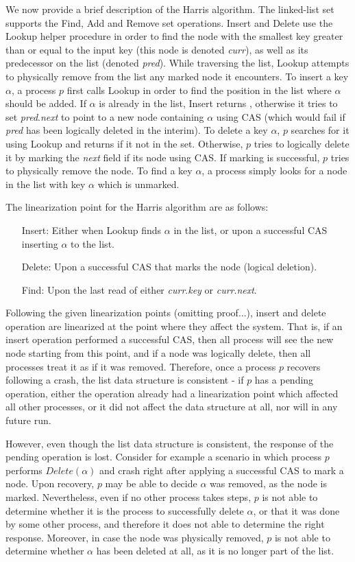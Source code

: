 We now provide a brief description of the Harris algorithm. The linked-list set supports the Find, Add and Remove set operations. Insert and Delete use the Lookup helper procedure in order to find the node with the smallest key greater than or equal to the input key (this node is denoted \emph{curr}), as well as its predecessor on the list (denoted \emph{pred}). While traversing the list, Lookup attempts to physically remove from the list any marked node it encounters. To insert a key $\alpha$, a process $p$ first calls Lookup in order to find the position in the list where $\alpha$ should be added. If $\alpha$ is already in the list, Insert returns \False, otherwise it tries to set \emph{pred}.\emph{next} to point to a new node containing $\alpha$ using CAS (which would fail if \emph{pred} has been logically deleted in the interim). To delete a key $\alpha$, $p$ searches for it using Lookup and returns \False if it not in the set. Otherwise, $p$ tries to logically delete it by marking the \emph{next} field if its node using CAS. If marking is successful, $p$  tries to physically remove the node. To find a key $\alpha$, a process simply looks for a node in the list with key $\alpha$ which is unmarked.

The linearization point for the Harris algorithm are as follows:
\begin{itemize}
	\item [Insert:] Either when Lookup finds $\alpha$ in the list, or upon a successful CAS inserting $\alpha$ to the list.
	\item [Delete:] Upon a successful CAS that marks the node (logical deletion).
	\item [Find:] Upon the last read of either \emph{curr}.\emph{key} or \emph{curr}.\emph{next}.
\end{itemize}

Following the given linearization points (omitting proof...), insert and delete operation are linearized at the point where they affect the system. That is, if an insert operation performed a successful CAS, then all process will see the new node starting from this point, and if a node was logically delete, then all processes treat it as if it was removed. Therefore, once a process $p$ recovers following a crash, the list data structure is consistent - if $p$ has a pending operation, either the operation already had a linearization point which affected all other processes, or it did not affect the data structure at all, nor will in any future run.

However, even though the list data structure is consistent, the response of the pending operation is lost. Consider for example a scenario in which process $p$ performs $Delete(\alpha)$ and crash right after applying a successful CAS to mark a node. Upon recovery, $p$ may be able to decide $\alpha$ was removed, as the node is marked. Nevertheless, even if no other process takes steps, $p$ is not able to determine whether it is the process to successfully delete $\alpha$, or that it was done by some other process, and therefore it does not able to determine the right response. Moreover, in case the node was physically removed, $p$ is not able to determine whether $\alpha$ has been deleted at all, as it is no longer part of the list.


